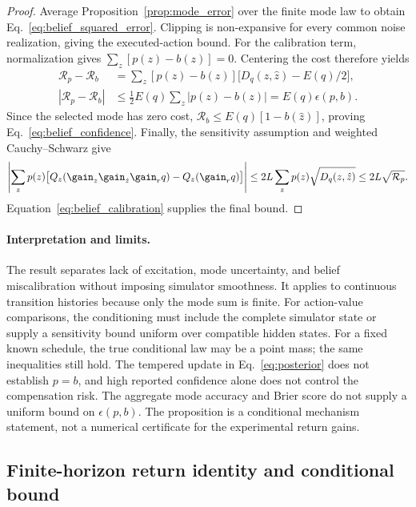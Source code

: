 \begin{proof}
Average Proposition~\ref{prop:mode_error} over the finite mode law to obtain Eq.~\eqref{eq:belief_squared_error}.
Clipping is non-expansive for every common noise realization, giving the executed-action bound.
For the calibration term, normalization gives $\sum_z[p(z)-b(z)]=0$.
Centering the cost therefore yields
\begin{align}
 \mathcal R_p-\mathcal R_b
 &=\sum_z[p(z)-b(z)]\bigl[D_q(z,\hat z)-E(q)/2\bigr],\\
 |\mathcal R_p-\mathcal R_b|
 &\le\tfrac12E(q)\sum_z|p(z)-b(z)|=E(q)\epsilon(p,b).
\end{align}
Since the selected mode has zero cost, $\mathcal R_b\le E(q)[1-b(\hat z)]$, proving Eq.~\eqref{eq:belief_confidence}.
Finally, the sensitivity assumption and weighted Cauchy--Schwarz give
\begin{equation}
 \left|\sum_z p(z)\bigl[Q_z(\gain_z\gain_{\hat z}\gain_rq)-Q_z(\gain_rq)\bigr]\right|
 \le 2L\sum_z p(z)\sqrt{D_q(z,\hat z)}
 \le 2L\sqrt{\mathcal R_p}.
\end{equation}
Equation~\eqref{eq:belief_calibration} supplies the final bound.
\end{proof}

\paragraph{Interpretation and limits.}
The result separates lack of excitation, mode uncertainty, and belief miscalibration without imposing simulator smoothness.
It applies to continuous transition histories because only the mode sum is finite.
For action-value comparisons, the conditioning must include the complete simulator state or supply a sensitivity bound uniform over compatible hidden states.
For a fixed known schedule, the true conditional law may be a point mass; the same inequalities still hold.
The tempered update in Eq.~\eqref{eq:posterior} does not establish $p=b$, and high reported confidence alone does not control the compensation risk.
The aggregate mode accuracy and Brier score do not supply a uniform bound on $\epsilon(p,b)$.
The proposition is a conditional mechanism statement, not a numerical certificate for the experimental return gains.

\subsection{Finite-horizon return identity and conditional bound}

